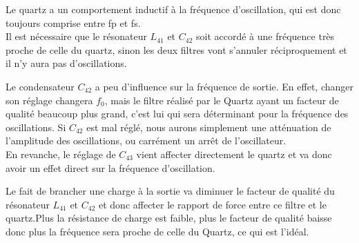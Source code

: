 \documentclass{article}
\begin{document}
Le quartz a un comportement inductif à la fréquence d'oscillation, qui est donc toujours comprise entre fp et fs.\\

Il est nécessaire que le résonateur $L_{41}$ et $C_{42}$ soit accordé à une fréquence très proche de celle du quartz, sinon les deux filtres vont s'annuler réciproquement et il n'y aura pas d'oscillations.


Le condensateur $C_{42}$ a peu d'influence sur la fréquence de sortie. En effet, changer son réglage changera $f_0$, mais le filtre réalisé par le Quartz ayant un facteur de qualité beaucoup plus grand, c'est lui qui sera déterminant pour la fréquence des oscillations. Si $C_{42}$ est mal réglé, nous aurons simplement une atténuation de l'amplitude des oscillations, ou carrément un arrêt de l'oscillateur.\\
En revanche, le réglage de $C_{43}$ vient affecter directement le quartz et va donc avoir un effet direct sur la fréquence d'oscillation.


Le fait de brancher une charge à la sortie va diminuer le facteur de qualité du résonateur $L_{41}$ et $C_{42}$ et donc affecter le rapport de force entre ce filtre et le quartz.Plus la résistance de charge est faible, plus le facteur de qualité baisse donc plus la fréquence sera proche de celle du Quartz, ce qui est l'idéal.

\end{document}
